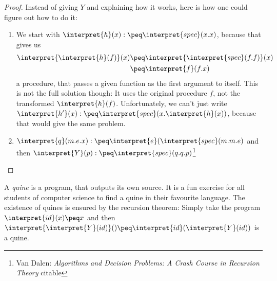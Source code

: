 \begin{proof}
	\TODO {}

	Instead of giving $Y$ and explaining how it works, here is how one could 
	figure out how to do it:

	\begin{enumerate}
		\item We start with $\interpret{h}(x):\peq \interpret{spec}(x.x)$, 
			because that gives us 
			\begin{equation*}
				\begin{split}
					\interpret{\interpret{h}(f)}(x)
					&\peq \interpret{\interpret{spec}(f.f)}(x)\\
					&\peq \interpret{f}(f.x)
				\end{split}
			\end{equation*}
			a procedure, that passes a given function as the first argument to 
			itself. This is not the full solution though: It uses the original 
			procedure $f$, not the transformed $\interpret{h}(f)$. Unfortunately, 
			we can't just write 
			$\interpret{h'}(x):\peq \interpret{spec}(x.\interpret{h}(x))$, because 
			that would give the same problem. 
		\item $\interpret{q}(m.e.x):\peq \interpret{e}(\interpret{spec}(m.m.e)$ 
			and then $\interpret{Y}(p):\peq \interpret{spec}(q.q.p)$\footnote{Van 
				Dalen: {\em Algorithms and Decision Problems: A Crash Course in 
				Recursion Theory} \TODO citable}
	\end{enumerate}
\end{proof}

\begin{example}[Quines]
	A {\em quine} is a program, that outputs its own source. It is a fun 
	exercise for all students of computer science to find a quine in their 
	favourite language. The existence of quines is ensured by the recursion theorem:
	Simply take the program $\interpret{id}(x)\peq x$ and then 
	$\interpret{\interpret{Y}(id)}() \peq \interpret{id}(\interpret{Y}(id))$ 
	is a quine.
\end{example}

